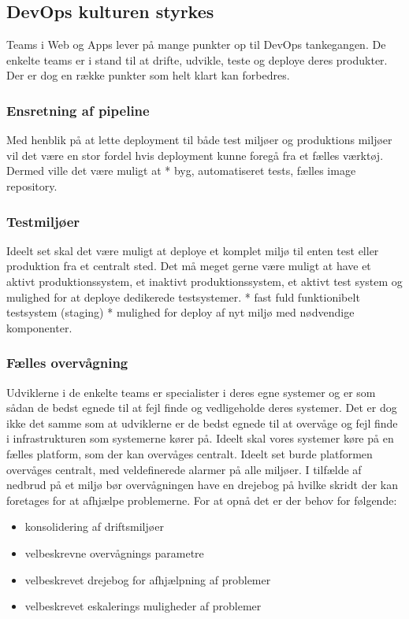 \documentclass{article}
\begin{document}


\subsection{DevOps kulturen styrkes}
Teams i Web og Apps lever på mange punkter op til DevOps tankegangen. De enkelte teams er i stand til at drifte, udvikle, teste og deploye deres produkter.  Der er dog en række punkter som helt klart kan forbedres.

\subsubsection{Ensretning af pipeline}
Med henblik på at lette deployment til både test miljøer og produktions miljøer vil det være en stor fordel hvis deployment kunne foregå fra et fælles værktøj. Dermed ville det være muligt at 
* byg, automatiseret tests, fælles image repository.


\subsubsection{Testmiljøer}
Ideelt set skal det være muligt at deploye et komplet miljø til enten test eller produktion fra et centralt sted. Det må meget gerne være muligt at have et aktivt produktionssystem, et inaktivt produktionssystem, et aktivt test system og mulighed for at deploye dedikerede testsystemer. 
* fast fuld funktionibelt testsystem (staging)
* mulighed for deploy af nyt miljø med nødvendige komponenter.



\subsubsection{Fælles overvågning}
Udviklerne i de enkelte teams er specialister i deres egne systemer og er som sådan de bedst egnede til at fejl finde og vedligeholde deres systemer. Det er dog ikke det samme som at udviklerne er de bedst egnede til at overvåge og fejl finde i infrastrukturen som systemerne kører på. Ideelt skal vores systemer køre på en fælles platform, som der kan overvåges centralt.
Ideelt set burde platformen overvåges centralt, med veldefinerede alarmer på alle miljøer. I tilfælde af nedbrud på et miljø bør overvågningen have en drejebog på hvilke skridt der kan foretages for at afhjælpe problemerne.
For at opnå det er der behov for følgende:
\begin{itemize}
\item konsolidering af driftsmiljøer
\item velbeskrevne overvågnings parametre
\item velbeskrevet drejebog for afhjælpning af problemer
\item velbeskrevet eskalerings muligheder af problemer
\end{itemize}
\end{document}
